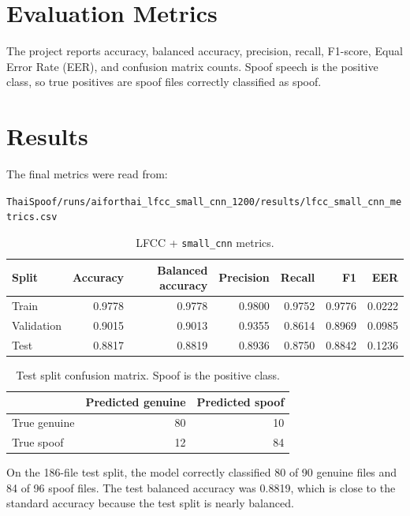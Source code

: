 \documentclass[11pt,a4paper]{article}
\begin{document}
\section{Evaluation Metrics}

The project reports accuracy, balanced accuracy, precision, recall, F1-score, Equal Error Rate (EER), and confusion matrix counts. Spoof speech is the positive class, so true positives are spoof files correctly classified as spoof.

\section{Results}

The final metrics were read from:

\begin{center}
\texttt{ThaiSpoof/runs/aiforthai\_lfcc\_small\_cnn\_1200/results/lfcc\_small\_cnn\_metrics.csv}
\end{center}

\begin{table}[h]
\centering
\caption{LFCC + \texttt{small\_cnn} metrics.}
\label{tab:metrics}
\begin{tabular}{lrrrrrr}
\toprule
Split & Accuracy & Balanced accuracy & Precision & Recall & F1 & EER \\
\midrule
Train & 0.9778 & 0.9778 & 0.9800 & 0.9752 & 0.9776 & 0.0222 \\
Validation & 0.9015 & 0.9013 & 0.9355 & 0.8614 & 0.8969 & 0.0985 \\
Test & 0.8817 & 0.8819 & 0.8936 & 0.8750 & 0.8842 & 0.1236 \\
\bottomrule
\end{tabular}
\end{table}

\begin{table}[h]
\centering
\caption{Test split confusion matrix. Spoof is the positive class.}
\label{tab:confusion}
\begin{tabular}{lrr}
\toprule
 & Predicted genuine & Predicted spoof \\
\midrule
True genuine & 80 & 10 \\
True spoof & 12 & 84 \\
\bottomrule
\end{tabular}
\end{table}

On the 186-file test split, the model correctly classified 80 of 90 genuine files and 84 of 96 spoof files. The test balanced accuracy was 0.8819, which is close to the standard accuracy because the test split is nearly balanced.
\end{document}
